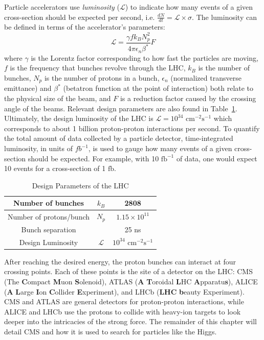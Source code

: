 Particle accelerators use \textit{luminosity} ($\mathcal{L}$) to indicate how many events of a given cross-section should be expected per second, i.e. $\frac{dN}{dt}=\mathcal{L}\times\sigma$. The luminosity can be defined in terms of the accelerator's parameters:
\begin{equation*}
\mathcal{L} = \frac{\gamma f k_{B}N_p^2}{4\pi \epsilon_{n} \beta^{*}}F
\end{equation*}
where $\gamma$ is the Lorentz factor corresponding to how fast the particles are moving, $f$ is the frequency that bunches revolve through the LHC, $k_{B}$ is the number of bunches, $N_p$ is the number of protons in a bunch, $\epsilon_n$ (normalized transverse emittance) and $\beta^{*}$ (betatron function at the point of interaction) both relate to the physical size of the beam, and $F$ is a reduction factor caused by the crossing angle of the beams. Relevant design parameters are also found in Table~\ref{tbl:LHCLumi}. Ultimately, the design luminosity of the LHC is $\mathcal{L} = 10^{34}$ $\mathrm{cm}^{-2}\mathrm{s}^{-1}$ which corresponds to about 1 billion proton-proton interactions per second. To quantify the total amount of data collected by a particle detector, time-integrated luminosity, in units of $fb^{-1}$, is used to gauge how many events of a given cross-section should be expected. For example, with 10 $\mathrm{fb}^{-1}$ of data, one would expect 10 events for a cross-section of 1 $\mathrm{fb}$.

\begin{table}[htp]
\begin{center}
\begin{tabular}{|c|c|c|}
\hline
Number of bunches & $k_B$ & 2808 \\
\hline
Number of protons/bunch & $N_p$ & $1.15\times10^{11}$ \\
\hline
Bunch separation & & 25 ns \\
\hline
Design Luminosity & $\mathcal{L}$ & $10^{34}$ $\mathrm{cm}^{-2}\mathrm{s}^{-1}$ \\
\hline
\end{tabular}
\caption{Design Parameters of the LHC}
\end{center}
\label{tbl:LHCLumi}
\end{table}%

After reaching the desired energy, the proton bunches can interact at four crossing points. Each of these points is the site of a detector on the LHC: CMS (The \textbf{C}ompact \textbf{M}uon \textbf{S}olenoid), ATLAS (\textbf{A} \textbf{T}oroidal \textbf{L}HC \textbf{A}pparatu\textbf{s}), ALICE (\textbf{A} \textbf{L}arge \textbf{I}on \textbf{C}ollider \textbf{E}xperiment), and LHCb (\textbf{LHC} \textbf{b}eauty Experiment). CMS and ATLAS are general detectors for proton-proton interactions, while ALICE and LHCb use the protons to collide with heavy-ion targets to look deeper into the intricacies of the strong force. The remainder of this chapter will detail CMS and how it is used to search for particles like the Higgs.

